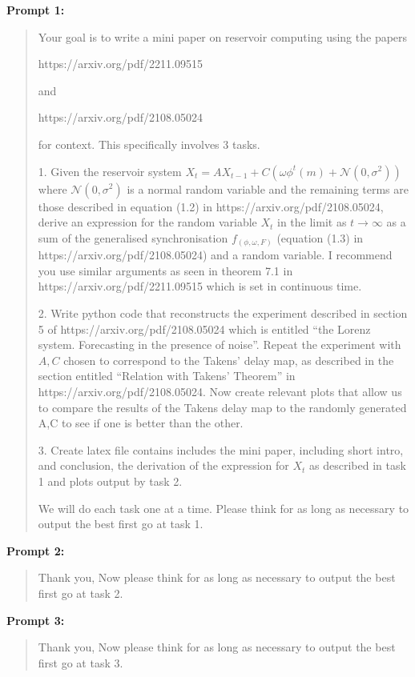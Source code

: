 \documentclass[11pt]{article}
\begin{document}
\textbf{Prompt 1:}
\begin{quote}
Your goal is to write a mini paper on reservoir computing using the papers 

https://arxiv.org/pdf/2211.09515 

and 

https://arxiv.org/pdf/2108.05024 

for context. This specifically involves 3 tasks.

1. Given the reservoir system $X_t = AX_{t-1} + C(\omega\phi^t(m) + \mathcal{N}(0,\sigma^2))$ where $\mathcal{N}(0,\sigma^2)$ is a normal random variable and the remaining terms are those described in equation (1.2) in https://arxiv.org/pdf/2108.05024, derive an expression for the random variable $X_t$ in the limit as $t \to \infty$ as a sum of the generalised synchronisation $f_{(\phi,\omega,F)}$ (equation (1.3) in https://arxiv.org/pdf/2108.05024) and a random variable. I recommend you use similar arguments as seen in theorem 7.1 in https://arxiv.org/pdf/2211.09515 which is set in continuous time.

2. Write python code that reconstructs the experiment described in section 5 of https://arxiv.org/pdf/2108.05024 which is entitled ``the Lorenz system. Forecasting in the presence of noise''. Repeat the experiment with $A,C$ chosen to correspond to the Takens' delay map, as described in the section entitled ``Relation with Takens' Theorem'' in https://arxiv.org/pdf/2108.05024. Now create relevant plots that allow us to compare the results of the Takens delay map to the randomly generated A,C to see if one is better than the other.

3. Create latex file contains includes the mini paper, including short intro, and conclusion, the derivation of the expression for $X_t$ as described in task 1 and plots output by task 2.

We will do each task one at a time. Please think for as long as necessary to output the best first go at task 1.
\end{quote}

\textbf{Prompt 2:}
\begin{quote}
Thank you, Now please think for as long as necessary to output the best first go at task 2.
\end{quote}

\textbf{Prompt 3:}
\begin{quote}
Thank you, Now please think for as long as necessary to output the best first go at task 3.
\end{quote}
\end{document}

